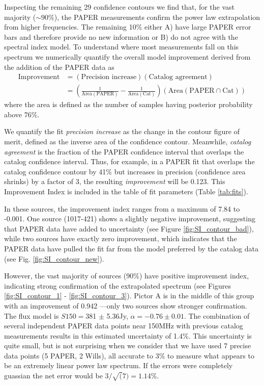 \documentclass[preprint]{aastex}
\newcommand{\PAPER}{\mathrm{PAPER}}
\begin{document}
Inspecting the remaining 29 confidence contours we find that, for the vast majority ($\sim
90$\%), the PAPER measurements confirm the power law extrapolation from higher
frequencies. The remaining 10\% either A) have large PAPER error bars and
therefore provide no new information or B) do not agree with the spectral index
model.  To understand where most measurements fall on this spectrum we
numerically quantify the overall model improvement derived from the addition of
the PAPER data as 
\begin{align}
\textrm{Improvement} &= \left(\textrm{Precision increase}\right) \left(\textrm{Catalog agreement}\right)\\
&= \left(\frac{1}{\textrm{Area}(\textrm{PAPER})} - \frac{1}{\textrm{Area}(\textrm{Cat})}\right) \left( \textrm{Area}(\PAPER \cap \textrm{Cat}) \right)
\end{align}
where the area is defined as the number of samples having posterior probability above 76\%.

We quantify the fit {\em precision increase} as the change in the contour
figure of merit, defined as the inverse area of the confidence contour.
Meanwhile, {\em catalog agreement} is the fraction of the PAPER confidence
interval that overlaps the catalog confidence interval.  Thus, for example, in
a PAPER fit that overlaps the catalog confidence contour by 41\% but increases
in precision (confidence area shrinks) by a factor of 3, the resulting {\em
improvement} will be 0.123.  This Improvement Index is included in the table
of fit parameters (Table \ref{tab:fits}).

In these sources, the improvement index ranges from a maximum of 7.84  to -0.001.
One source (1017-421) shows a slightly negative improvement, suggesting that PAPER data have
added to uncertainty (see Figure \ref{fig:SI_contour_bad}), while two sources
have exactly zero improvement, which indicates that the PAPER data have pulled
the fit far from the model preferred by the catalog data (see Fig.
\ref{fig:SI_contour_new}).  

However, the vast majority of sources (90\%) have positive improvement index,
indicating strong confirmation of the extrapolated spectrum (see Figures
\ref{fig:SI_contour_1} - \ref{fig:SI_contour_3}).  Pictor A is in the middle of
this group  with an improvement of 0.942 ---only two sources show stronger
confirmation.  The flux model is $S150=$381 $\pm$ 5.36Jy, $\alpha=-0.76\pm0.01$.
The combination of several independent PAPER data points near 150MHz with
previous catalog measurements results in this estimated uncertainty of 1.4\%.
This uncertainty is quite small, but is not surprising when we consider that we have
used 7 precise data points (5 PAPER, 2 Wills), all accurate to 3\% to measure what appears to
be an extremely linear power law spectrum. If the errors were completely guassian
the net error would be $3/\sqrt(7) = 1.14$\%. 
\end{document}
